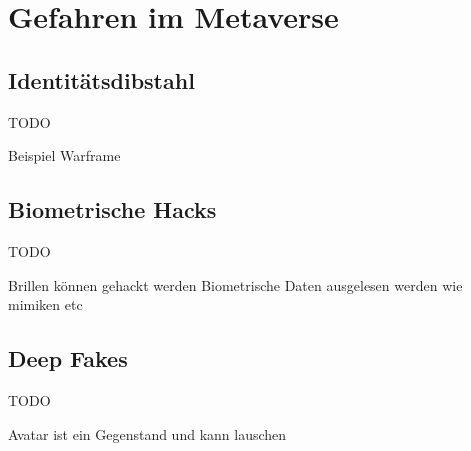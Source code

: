 \chapter{Gefahren im Metaverse}\label{ch:GefahrenimMetaverse}

\section{Identitätsdibstahl}
TODO

Beispiel Warframe

\section{Biometrische Hacks}
TODO

Brillen können gehackt werden Biometrische Daten ausgelesen werden wie mimiken etc 

\section{Deep Fakes}
TODO

Avatar ist ein Gegenstand und kann lauschen
